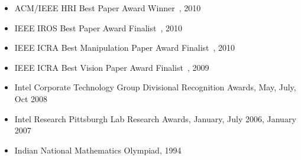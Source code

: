 \begin{itemize}
\item ACM/IEEE HRI Best Paper Award Winner~\cite{lee2010gracefully}, 2010
\item IEEE IROS Best Paper Award Finalist~\cite{dogar2010pushgrasp}, 2010
\item IEEE ICRA Best Manipulation Paper Award Finalist~\cite{chang2010pregrasp}, 2010
\item IEEE ICRA Best Vision Paper Award Finalist~\cite{collet2009object}, 2009
\item Intel Corporate Technology Group Divisional Recognition Awards, May, July, Oct 2008
\item Intel Research Pittsburgh Lab Research Awards, January, July 2006, January 2007
\item Indian National Mathematics Olympiad, 1994
\end{itemize}
